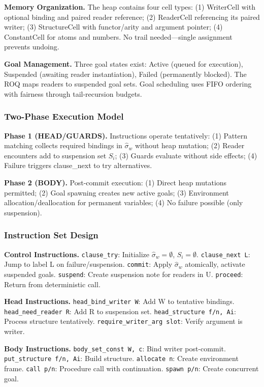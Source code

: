 \documentclass[runningheads,thm-restate]{llncs}
\newcommand{\mypara}[1]{\smallskip\noindent\textbf{#1.}}
\begin{document}
\mypara{Memory Organization}
The heap contains four cell types: (1) WriterCell with optional binding and paired reader reference; (2) ReaderCell referencing its paired writer; (3) StructureCell with functor/arity and argument pointer; (4) ConstantCell for atoms and numbers. No trail needed—single assignment prevents undoing.

\mypara{Goal Management}
Three goal states exist: Active (queued for execution), Suspended (awaiting reader instantiation), Failed (permanently blocked). The ROQ maps readers to suspended goal sets. Goal scheduling uses FIFO ordering with fairness through tail-recursion budgets.

\subsubsection{Two-Phase Execution Model}

\mypara{Phase 1 (HEAD/GUARDS)}
Instructions operate tentatively: (1) Pattern matching collects required bindings in $\hat{\sigma}_w$ without heap mutation; (2) Reader encounters add to suspension set $S_i$; (3) Guards evaluate without side effects; (4) Failure triggers clause\_next to try alternatives.

\mypara{Phase 2 (BODY)}
Post-commit execution: (1) Direct heap mutations permitted; (2) Goal spawning creates new active goals; (3) Environment allocation/deallocation for permanent variables; (4) No failure possible (only suspension).

\subsubsection{Instruction Set Design}

\mypara{Control Instructions}
\texttt{clause\_try}: Initialize $\hat{\sigma}_w = \emptyset$, $S_i = \emptyset$. \texttt{clause\_next L}: Jump to label L on failure/suspension. \texttt{commit}: Apply $\hat{\sigma}_w$ atomically, activate suspended goals. \texttt{suspend}: Create suspension note for readers in U. \texttt{proceed}: Return from deterministic call.

\mypara{Head Instructions}
\texttt{head\_bind\_writer W}: Add W to tentative bindings. \texttt{head\_need\_reader R}: Add R to suspension set. \texttt{head\_structure f/n, Ai}: Process structure tentatively. \texttt{require\_writer\_arg slot}: Verify argument is writer.

\mypara{Body Instructions}
\texttt{body\_set\_const W, c}: Bind writer post-commit. \texttt{put\_structure f/n, Ai}: Build structure. \texttt{allocate n}: Create environment frame. \texttt{call p/n}: Procedure call with continuation. \texttt{spawn p/n}: Create concurrent goal.
\end{document}
